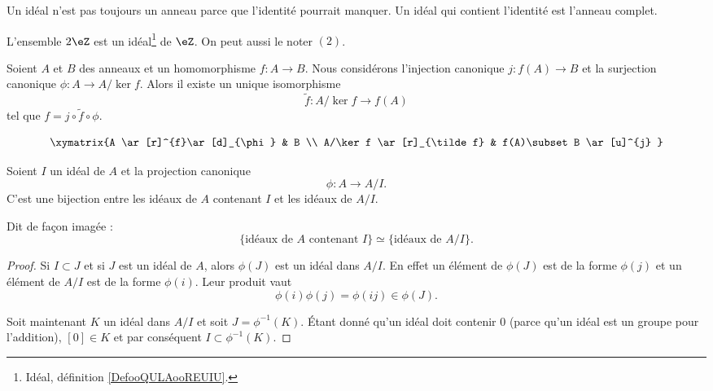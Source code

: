 \begin{remark}
	Un idéal n'est pas toujours un anneau parce que l'identité pourrait manquer. Un idéal qui contient l'identité est l'anneau complet.
\end{remark}

\begin{lemma}       \label{LEMooQAYSooCYJXkC}
	L'ensemble \( 2\eZ\) est un idéal\footnote{Idéal, définition \ref{DefooQULAooREUIU}.} de \( \eZ\). On peut aussi le noter \( (2) \).
\end{lemma}

\begin{proposition}   \label{PROPooJALPooHFIObB}
	Soient \( A\) et \( B\) des anneaux et un homomorphisme \( f\colon A\to B\). Nous considérons l'injection canonique \( j\colon f(A)\to B\) et la surjection canonique \( \phi\colon A\to A/\ker f\). Alors il existe un unique isomorphisme
	\begin{equation}
		\tilde f \colon A/\ker f\to f(A)
	\end{equation}
	tel que \( f=j\circ\tilde f\circ\phi\).

	\begin{equation}
		\xymatrix{%
			A \ar[r]^{f}\ar[d]_{\phi}       &   B                         \\
			A/\ker f    \ar[r]_{\tilde f}   &   f(A)\subset B \ar[u]^{j}
		}
	\end{equation}
\end{proposition}

\begin{proposition}     \label{PropIJJIdsousphi}
	Soient \( I\) un idéal de \( A\) et la projection canonique
	\begin{equation}
		\phi\colon A\to A/I.
	\end{equation}
	C'est une bijection entre les idéaux de \( A\) contenant \( I\) et les idéaux de \( A/I\).

	Dit de façon imagée :
	\begin{equation}        \label{EqKbrizu}
		\{ \text{idéaux de } A\text{ contenant } I\}\simeq\{ \text{idéaux de } A/I \}.
	\end{equation}
\end{proposition}

\begin{proof}
	Si \( I\subset J\) et si \( J \) est un idéal de \( A\), alors \( \phi(J)\) est un idéal dans \( A/I\). En effet un élément de \( \phi(J)\) est de la forme \( \phi(j)\) et un élément de \( A/I\) est de la forme \( \phi(i)\). Leur produit vaut
	\begin{equation}
		\phi(i)\phi(j)=\phi(ij)\in\phi(J).
	\end{equation}

	Soit maintenant \( K\) un idéal dans \( A/I\) et soit \( J=\phi^{-1}(K)\). Étant donné qu'un idéal doit contenir \( 0\) (parce qu'un idéal est un groupe pour l'addition), \( [0]\in K\) et par conséquent \( I\subset\phi^{-1}(K)\).
\end{proof}

